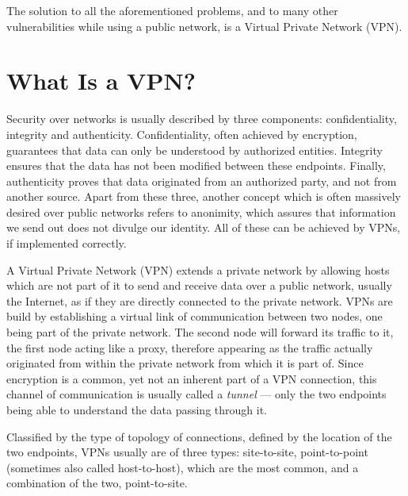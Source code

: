 \documentclass[a4paper,12pt]{report}
\begin{document}
		The solution to all the aforementioned problems, and to many other vulnerabilities while using a public network, is a Virtual Private Network (VPN).
		
		\section{What Is a VPN?}
		Security over networks is usually described by three components: confidentiality, integrity and authenticity. Confidentiality, often achieved by encryption, guarantees that data can only be understood by authorized entities. Integrity ensures that the data has not been modified between these endpoints. Finally, authenticity proves that data originated from an authorized party, and not from another source. Apart from these three, another concept which is often massively desired over public networks refers to anonimity, which assures that information we send out does not divulge our identity. All of these can be achieved by VPNs, if implemented correctly.
		
		A Virtual Private Network (VPN) extends a private network by allowing hosts which are not part of it to send and receive data over a public network, usually the Internet, as if they are directly connected to the private network. VPNs are build by establishing a virtual link of communication between two nodes, one being part of the private network. The second node will forward its traffic to it, the first node acting like a proxy, therefore appearing as the traffic actually originated from within the private network from which it is part of. Since encryption is a common, yet not an inherent part of a VPN connection, this channel of communication is usually called a \textit{tunnel} --- only the two endpoints being able to understand the data passing through it. 
		
		Classified by the type of topology of connections, defined by the location of the two endpoints, VPNs usually are of three types: site-to-site, point-to-point (sometimes also called host-to-host), which are the most common, and a combination of the two, point-to-site.
		
\end{document}
